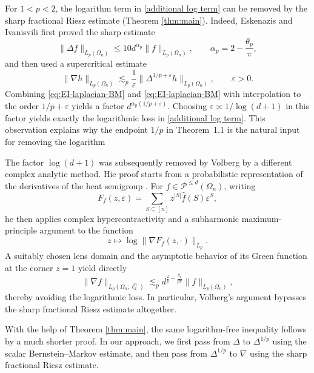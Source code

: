 \documentclass{amsart}
\numberwithin{equation}{section}
\theoremstyle{definition}
\theoremstyle{remark}
\newcommand{\1}{\mathbf 1}
\begin{document}
For $1<p<2$, the logarithm term in \eqref{additional log term} can be removed by the sharp fractional Riesz estimate (Theorem \ref{thm:main}).  Indeed, Eskenazis and Ivanisvili first proved the sharp estimate
\begin{equation}
\label{eq:EI-laplacian-BM}
  \|\Delta f\|_{L_p(\Omega_n)}
  \le 10d^{\alpha_p}\|f\|_{L_p(\Omega_n)},
  \qquad
  \alpha_p=2-\frac{\theta_p}{\pi},
\end{equation}
and then used a supercritical estimate
\begin{equation}
\label{eq:old-supercritical}
  \|\nabla h\|_{L_{p}(\Omega_{n})}
  \lesssim_p \frac1\varepsilon
  \|\Delta^{1/p+\varepsilon}h\|_{L_{p}(\Omega_{n})},
  \qquad \varepsilon>0.
\end{equation}
Combining \eqref{eq:EI-laplacian-BM} and \eqref{eq:EI-laplacian-BM} with interpolation to the order $1/p+\varepsilon$ yields a factor
$d^{\alpha_p(1/p+\varepsilon)}$. Choosing $\varepsilon\asymp1/\log(d+1)$ in this factor yields exactly the logarithmic loss in \eqref{additional log term}.  This observation explains why the endpoint $1/p$ in Theorem~1.1 is the natural input for removing the logarithm

The factor $\log(d+1)$ was subsequently removed by Volberg \cite{V2024} by a different complex analytic method. Hie proof starts from a probabilistic representation of the derivatives of the heat semigroup \cite{IVHV2020}. For $f\in \mathcal{P}^{\leq d}(\Omega_{n})$, writing
\[
 F_f(z,\varepsilon)=
 \sum_{S\subseteq[n]}z^{|S|}
 \widehat f(S)\varepsilon^S,
\]
he then applies complex hypercontractivity and a subharmonic
maximum-principle argument to the function
\[
 z\mapsto
 \log\|\nabla F_f(z,\cdot)\|_{L_p}.
\]
A suitably chosen lens domain and the asymptotic behavior of its Green
function at the corner $z=1$ yield directly
\[
 \|\nabla f\|_{L_{p}(\Omega_{n};\ell^{n}_{2})} \lesssim_p d^{\frac{2}{p}-\frac{\theta_p}{p\pi}}\|f\|_{L_{p}(\Omega_{n})},
\]
thereby avoiding the logarithmic loss. In particular, Volberg's argument bypasses the sharp fractional Riesz estimate altogether.

With the help of Theorem \ref{thm:main}, the same logarithm-free inequality follows by a much shorter proof. In our approach, we first pass from $\Delta$ to $\Delta^{1/p}$ using the scalar Bernstein--Markov estimate, and then pass from $\Delta^{1/p}$ to $\nabla$ using the sharp fractional Riesz estimate.
\end{document}
